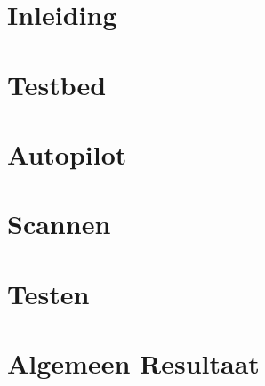 \documentclass[eind]{Setup/penoverslag}
\begin{document}
\maketitlepage


\begin{abstract}

\end{abstract}


\tableofcontents\newpage

\section*{Inleiding}
\label{sec: Inleiding}

\newpage

\section{Testbed}
\label{sec: Testbed}

\label{sec:polyhedraTestbed}
\newpage




\newpage
\section{Autopilot}
\label{sec: Autopilot}


\label{sec: Rotaties}



\section{Scannen}
\label{sec: scannen}


\label{sec: 3dAutopilotScan}



\section{Testen}
\label{sec: Testen}



\section{Algemeen Resultaat}
\label{sec: AlgemeenResultaat}

\end{document}
